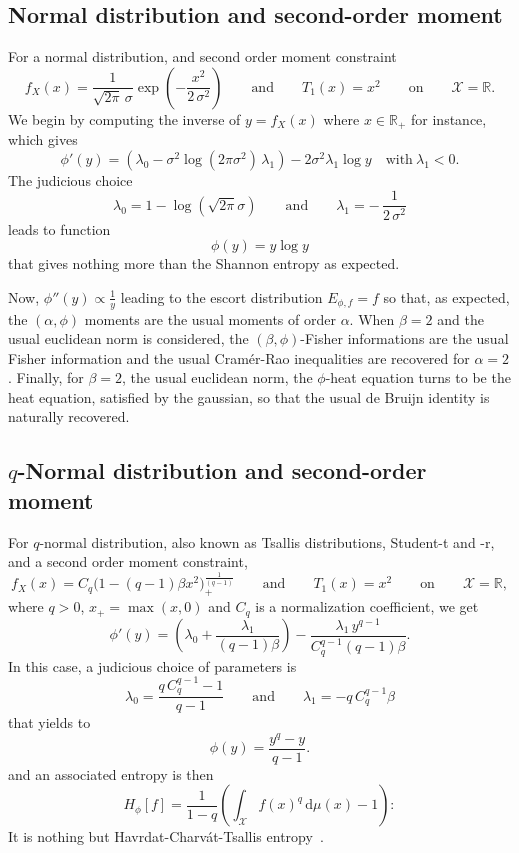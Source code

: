 \documentclass[english,sort&compress]{elsarticle}
\theoremstyle{definition}
\theoremstyle{plain}
\theoremstyle{plain}
\def\dmu{\mathrm{d}\mu}
\def\Rset{\mathbb{R}}
\def\X{\mathcal{X}}
\begin{document}

\subsection{Normal distribution and second-order moment}
\label{subsec:NormalSecondOrder}

For a normal distribution, and second order moment constraint 
%
\[
f_X(x)  = \frac{1}{\sqrt{2\pi} \,\sigma}  \exp\left( -\frac{x^2}{2  \, \sigma^2}
\right)  \qquad \mbox{and}  \qquad T_1(x)  = x^2  \qquad \mbox{on}  \qquad  \X =
\Rset.
\]
%
We begin  by computing the  inverse of  $y = f_X(x)$  where $x \in  \Rset_+$ for
instance, which gives
%
\[
\phi'(y) = \left( \lambda_0 - \sigma^2 \log(2 \pi \sigma^2) \, \lambda_1 \right)
- 2 \sigma^2 \lambda_1 \log y \quad \mbox{with} \: \lambda_1 < 0.
\]
%
The judicious choice
%
\[
\lambda_0 = 1 - \log( \sqrt{2\pi}  \sigma ) \qquad \mbox{and} \qquad \lambda_1 =
- \, \frac{1}{2 \, \sigma^2}
\]
%
leads to function
%
\[
\phi(y) = y \log y
\]
%
that gives nothing more than the Shannon entropy as expected.

Now, $\phi''(y) \propto \frac1y$ leading  to the escort distribution $E_{\phi,f}
= f$ so that, as expected, the  $(\alpha,\phi)$ moments are the usual moments of
order $\alpha$. When $\beta = 2$ and the usual euclidean norm is considered, the
$(\beta,\phi)$-Fisher  informations are  the  usual Fisher  information and  the
usual Cram\'er-Rao  inequalities are recovered  for $\alpha = 2$.   Finally, for
$\beta = 2$, the usual euclidean norm,  the $\phi$-heat equation turns to be the
heat equation, satisfied  by the gaussian, so that the  usual de Bruijn identity
is naturally recovered.


\subsection{$q$-Normal distribution and second-order moment}
\label{subsec:qNormalSecondOrder}

For $q$-normal distribution, also  known as Tsallis distributions, Student-t and
-r, and a second order moment constraint,
%
\[
f_X(x)  = C_q  \Big( 1  - (q-1)  \beta x^2  \Big)_{\!+}^{\frac{1}{(q-1)}} \qquad
\mbox{and} \qquad T_1(x) = x^2 \qquad \mbox{on} \qquad \X = \Rset,
\]
%
where $q  > 0$, $x_+ = \max(x,0)$  and $C_q$ is a  normalization coefficient, we
get
%
\[
\phi'(y)  =   \left(  \lambda_0   +  \frac{\lambda_1}{(q-1)  \beta}   \right)  -
\frac{\lambda_1 \, y^{q-1}}{C_q^{q-1} (q-1) \beta}.
\]
%
In this case, a judicious choice of parameters is
%
\[
\lambda_0 = \frac{q \, C_q^{q-1}  - 1}{q-1} \qquad \mbox{and} \qquad \lambda_1 =
-q \, C_q^{q-1} \beta
\]
%
that yields to 
%
\[
\phi(y) = \frac{y^q-y}{q-1}.
\]
%
and an associated entropy is then 
%
\[
H_\phi[f] = \frac{1}{1-q} \left( \int_\X f(x)^q \, \dmu(x) - 1 \right):
\]
%
It  is  nothing  but  Havrdat-Charv\'at-Tsallis  entropy~\cite{HavCha67,  Dar70,
  Tsa88, CosHer03}.
\end{document}
